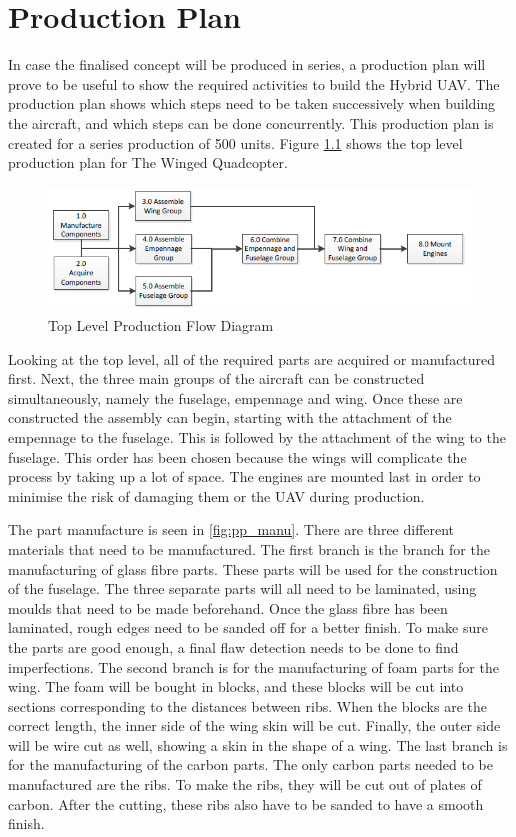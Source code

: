 \chapter{Production Plan}
\setlength{\parindent}{15pt}
\label{ch:prod_plan}

In case the finalised concept will be produced in series, a production plan will prove to be useful to show the required activities to build the Hybrid UAV. The production plan shows which steps need to be taken successively when building the aircraft, and which steps can be done concurrently. This production plan is created for a series production of 500 units. Figure \ref{fig:pp_top} shows the top level production plan for The Winged Quadcopter.

\begin{figure}[H]
    \centering
    \includegraphics[width=\textwidth]{Production/Figures/Summary}
    \caption{Top Level Production Flow Diagram}
    \label{fig:pp_top}
\end{figure}

Looking at the top level, all of the required parts are acquired or manufactured first. Next, the three main groups of the aircraft can be constructed simultaneously, namely the fuselage, empennage and wing. Once these are constructed the assembly can begin, starting with the attachment of the empennage to the fuselage. This is followed by the attachment of the wing to the fuselage. This order has been chosen because the wings will complicate the process by taking up a lot of space. The engines are mounted last in order to minimise the risk of damaging them or the UAV during production.

The part manufacture is seen in \autoref{fig:pp_manu}. There are three different materials that need to be manufactured. The first branch is the branch for the manufacturing of glass fibre parts. These parts will be used for the construction of the fuselage. The three separate parts will all need to be laminated, using moulds that need to be made beforehand. Once the glass fibre has been laminated, rough edges need to be sanded off for a better finish. To make sure the parts are good enough, a final flaw detection needs to be done to find imperfections. The second branch is for the manufacturing of foam parts for the wing. The foam will be bought in blocks, and these blocks will be cut into sections corresponding to the distances between ribs. When the blocks are the correct length, the inner side of the wing skin will be cut. Finally, the outer side will be wire cut as well, showing a skin in the shape of a wing. The last branch is for the manufacturing of the carbon parts. The only carbon parts needed to be manufactured are the ribs. To make the ribs, they will be cut out of plates of carbon. After the cutting, these ribs also have to be sanded to have a smooth finish.

